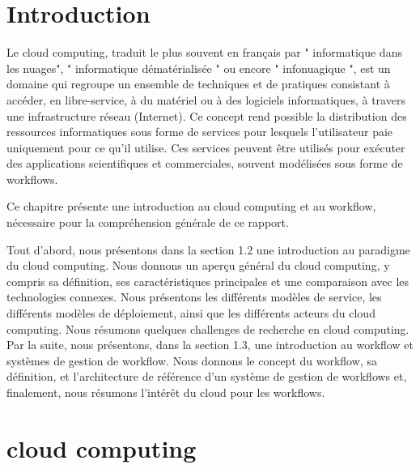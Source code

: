  	 \section{Introduction}
 	  
    
    Le cloud computing, traduit le plus souvent en français par " informatique dans les nuages", " informatique dématérialisée " ou encore " infonuagique ", est un domaine qui regroupe un ensemble de techniques et de pratiques consistant à accéder, en libre-service, à du matériel ou à des logiciels informatiques, à travers une infrastructure réseau (Internet). Ce concept rend possible la distribution des ressources informatiques sous forme de services pour lesquels l'utilisateur paie uniquement pour ce qu'il utilise. Ces services peuvent être utilisés pour exécuter des applications scientifiques et commerciales, souvent modélisées sous forme de workflows.
     
    Ce chapitre présente une introduction au cloud computing et au workflow, nécessaire pour la compréhension générale de ce rapport.
    
    Tout d’abord, nous présentons dans la section 1.2 une introduction au paradigme du cloud computing. Nous donnons un aperçu général du cloud computing, y compris sa définition, ses caractéristiques principales et une comparaison avec les technologies connexes. Nous présentons les différents modèles de service, les différents modèles de déploiement, ainsi que les différents acteurs du cloud computing. Nous résumons quelques challenges de recherche en cloud computing. Par la suite, nous présentons, dans la section 1.3, une introduction au workflow et systèmes de gestion de workflow. Nous donnons le concept du workflow, sa définition, et l’architecture de référence d’un système de gestion de workflows et, finalement, nous résumons l'intérêt du cloud pour les workflows.
    
    \section{cloud computing}
